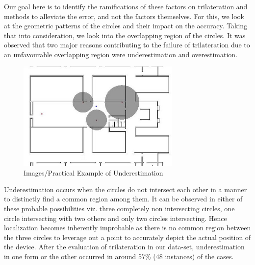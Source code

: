 \documentclass[twocolumn, 11pt]{IEEEtran}
\begin{document}
Our goal here is to identify the ramifications of these factors on trilateration and methods to alleviate the error, and not the factors themselves. For this, we look at the geometric patterns of the circles and their impact on the accuracy. Taking that into consideration, we look into the overlapping region of the circles. It was observed that two major reasons contributing to the failure of trilateration due to an unfavourable overlapping region were underestimation and overestimation. 

 

 \begin{figure}[ht!]
\centering
\includegraphics[width=80mm]{Images/Underestimation.jpg}
\caption{ Images/Practical Example of Underestimation \label{overflow}}
\end{figure}

 
Underestimation occurs when the circles do not intersect each other in a manner to distinctly find a common region among them. It can be observed in either of these probable possibilities viz. three completely non intersecting circles, one circle intersecting with two others and only two circles intersecting. Hence localization becomes inherently improbable as there is no common region between the three circles to leverage out a point to accurately depict the actual position of the device. After the evaluation of trilateration in our data-set, underestimation in one form or the other occurred in around 57\% (48 instances) of the cases. 
 
\end{document}
